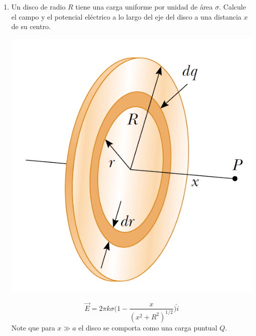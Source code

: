 \documentclass[11pt,twocolumn]{article}
\begin{document}
\begin{enumerate}
\item Un disco de radio $R$ tiene una carga uniforme por unidad de área $\sigma$. Calcule el campo y el potencial eléctrico a lo largo del eje del disco a una distancia $x$ de su centro.
{
\begin{center}
\includegraphics[scale=0.2]{disco}
\end{center}
}
\begin{displaymath}
\vec{E}=2\pi k \sigma \Big(1-\dfrac{x}{(x^2+R^2)^{1/2}}\Big)\hat{i}
\end{displaymath}
\small{Note que para $x\gg a$ el disco se comporta como una carga puntual $Q$.} 


\end{enumerate}
\end{document}

